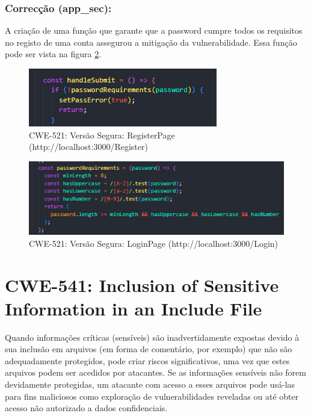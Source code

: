 \subsubsection{Correcção (app\_sec):}
A criação de uma função que garante que a password cumpre todos os requisitos no registo de uma conta assegurou a mitigação da vulnerabilidade.
Essa função pode ser vista na figura \ref{fig:cwe521-safe-registerpage2}.
\begin{figure}[H]
  \centering
    \includegraphics[width=0.8\linewidth]{images/CWE521-safe-RegisterPage1.png}
    \caption{CWE-521: Versão Segura: RegisterPage (http://localhost:3000/Register)}
    \label{fig:cwe521-safe-registerpage1}
\end{figure}
\begin{figure}[H]
  \centering
    \includegraphics[width=0.8\linewidth]{images/CWE521-safe-RegisterPage2.png}
    \caption{CWE-521: Versão Segura: LoginPage  (http://localhost:3000/Login)}
    \label{fig:cwe521-safe-registerpage2}
\end{figure}

%
%
\section{CWE-541: Inclusion of Sensitive Information in an Include File}
\label{sec.cwe541}
Quando informações críticas (sensíveis) são inadvertidamente expostas devido à sua inclusão em arquivos (em forma de comentário, por exemplo) que não são adequadamente protegidos, pode criar riscos significativos, uma vez que estes arquivos podem ser acedidos por atacantes. Se as informações sensíveis não forem devidamente protegidas, um atacante com acesso a esses arquivos pode usá-las para fins maliciosos como exploração de vulnerabilidades reveladas ou até obter acesso não autorizado a dados confidenciais. \\
